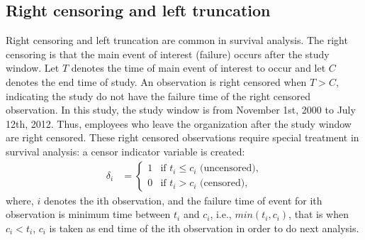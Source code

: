 \subsection{Right censoring and left truncation}
Right censoring and left truncation are common in survival analysis. The right censoring is that the main event of interest (failure) occurs after the study window. Let $T$ denotes the time of main event of interest to occur and let $C$ denotes the end time of study. An observation is right censored when $T> C$, indicating the study do not have the failure time of the right censored observation. In this study, the study window is from November 1st, 2000 to July 12th, 2012. Thus, employees who leave the organization after the study window are right censored. These right censored observations require special treatment in survival analysis: a censor indicator variable is created: 
\begin{align*}
\delta_i&=
\begin{cases}
1   &\text{if  }  t_i \leq c_i \text{ (uncensored),}\\
0   &\text{if  }  t_i > c_i \text{ (censored),}
\end{cases}
\end{align*}
where, $i$ denotes the ith observation, and the failure time of event for ith observation is minimum time between $t_i$ and $c_i$, i.e., $min(t_i, c_i)$, that is when $ c_i <t_i $, $c_i$ is taken as end time of the ith observation in order to do next  analysis.

